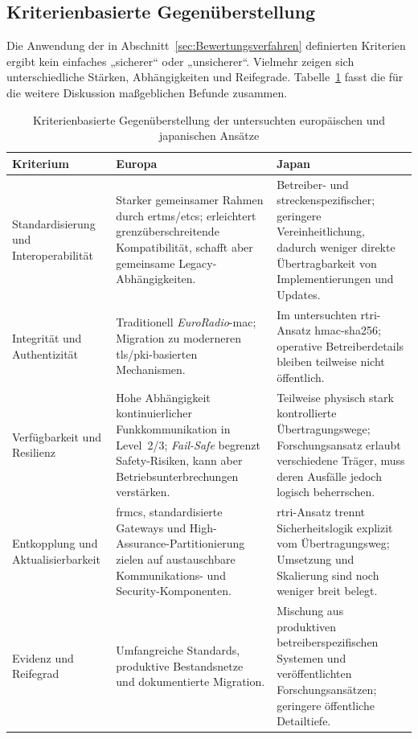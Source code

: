 \documentclass[runningheads]{res/llncs}
\begin{document}
\subsection{Kriterienbasierte Gegenüberstellung}
\label{sec:Kriterienbasierte_Gegenüberstellung}
Die Anwendung der in Abschnitt~\ref{sec:Bewertungsverfahren} definierten Kriterien ergibt kein einfaches „sicherer“ oder „unsicherer“. Vielmehr zeigen sich unterschiedliche Stärken, Abhängigkeiten und Reifegrade. Tabelle~\ref{tab:vergleich-europa-japan} fasst die für die weitere Diskussion maßgeblichen Befunde zusammen.

\begin{table}[htbp]
\centering
\caption{Kriterienbasierte Gegenüberstellung der untersuchten europäischen und japanischen Ansätze}
\label{tab:vergleich-europa-japan}
\begin{tabularx}{\textwidth}{@{} p{} X X @{} }
\toprule
\textbf{Kriterium} & \textbf{Europa} & \textbf{Japan} \\
\midrule
Standardisierung und Interoperabilität & Starker gemeinsamer Rahmen durch \gls{ertms}/\gls{etcs}; erleichtert grenzüberschreitende Kompatibilität, schafft aber gemeinsame Legacy-Abhängigkeiten. & Betreiber- und streckenspezifischer; geringere Vereinheitlichung, dadurch weniger direkte Übertragbarkeit von Implementierungen und Updates. \\
Integrität und Authentizität & Traditionell \textit{EuroRadio}-\gls{mac}; Migration zu moderneren \gls{tls}/\gls{pki}-basierten Mechanismen. & Im untersuchten \gls{rtri}-Ansatz \gls{hmac-sha256}; operative Betreiberdetails bleiben teilweise nicht öffentlich. \\
Verfügbarkeit und Resilienz & Hohe Abhängigkeit kontinuierlicher Funkkommunikation in Level~2/3; \textit{Fail-Safe} begrenzt Safety-Risiken, kann aber Betriebsunterbrechungen verstärken. & Teilweise physisch stark kontrollierte Übertragungswege; Forschungsansatz erlaubt verschiedene Träger, muss deren Ausfälle jedoch logisch beherrschen. \\
Entkopplung und Aktualisierbarkeit & \gls{frmcs}, standardisierte Gateways und High-Assurance-Partitionierung zielen auf austauschbare Kommunikations- und Security-Komponenten. & \gls{rtri}-Ansatz trennt Sicherheitslogik explizit vom Übertragungsweg; Umsetzung und Skalierung sind noch weniger breit belegt. \\
Evidenz und Reifegrad & Umfangreiche Standards, produktive Bestandsnetze und dokumentierte Migration. & Mischung aus produktiven betreiberspezifischen Systemen und veröffentlichten Forschungsansätzen; geringere öffentliche Detailtiefe. \\
\bottomrule
\end{tabularx}
\end{table}
\end{document}
